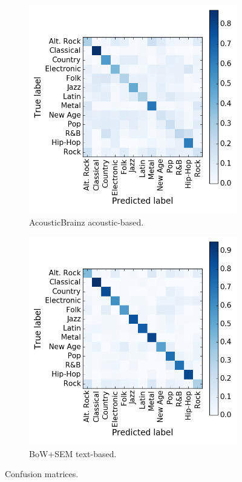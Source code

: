 \begin{figure}[ht!]
    \centering
    \begin{subfigure}{.45\textwidth}
        \centering
        \includegraphics[width=\linewidth]{ch06_similarity_pics/confusion_audio.png}
    	\caption{AcousticBrainz acoustic-based.}
    \end{subfigure}
    \begin{subfigure}{.45\textwidth}
        \centering
        \includegraphics[width=\linewidth]{ch06_similarity_pics/confusion_text.png}
		\caption{BoW+SEM text-based.}
    \end{subfigure}
    \caption{Confusion matrices.}
	\label{fig:similarity:confusion}
\end{figure}

